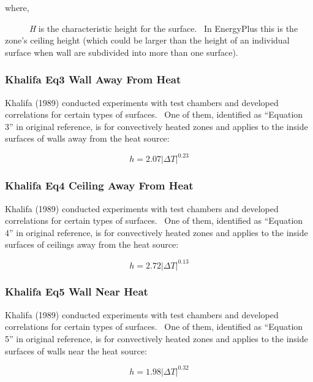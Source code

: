 where,

~~~~~ \emph{H} is the characteristic height for the surface.~ In EnergyPlus this is the zone's ceiling height (which could be larger than the height of an individual surface when wall are subdivided into more than one surface).

\subsubsection{Khalifa Eq3 Wall Away From Heat}\label{khalifa-eq3-wall-away-from-heat}

Khalifa (1989) conducted experiments with test chambers and developed correlations for certain types of surfaces.~ One of them, identified as ``Equation 3'' in original reference, is for convectively heated zones and applies to the inside surfaces of walls away from the heat source:

\begin{equation}
h = 2.07{\left| {\Delta T} \right|^{0.23}}
\end{equation}

\subsubsection{Khalifa Eq4 Ceiling Away From Heat}\label{khalifa-eq4-ceiling-away-from-heat}

Khalifa (1989) conducted experiments with test chambers and developed correlations for certain types of surfaces.~ One of them, identified as ``Equation 4'' in original reference, is for convectively heated zones and applies to the inside surfaces of ceilings away from the heat source:

\begin{equation}
h = 2.72{\left| {\Delta T} \right|^{0.13}}
\end{equation}

\subsubsection{Khalifa Eq5 Wall Near Heat}\label{khalifa-eq5-wall-near-heat}

Khalifa (1989) conducted experiments with test chambers and developed correlations for certain types of surfaces.~ One of them, identified as ``Equation 5'' in original reference, is for convectively heated zones and applies to the inside surfaces of walls near the heat source:

\begin{equation}
h = 1.98{\left| {\Delta T} \right|^{0.32}}
\end{equation}

